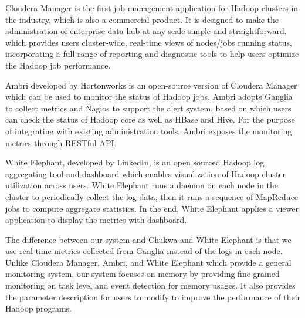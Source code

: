 Cloudera Manager\cite{http://www.cloudera.com} is the first job management application for Hadoop clusters in the industry, which is also a commercial product.
It is designed to make the administration of enterprise data hub at any scale simple and straightforward, which provides users cluster-wide, real-time views of nodes/jobs running status, incorporating a full range of reporting and diagnostic tools to help users optimize the Hadoop job performance.

Ambri\cite{http://hortonworks.com/hadoop/ambari} developed by Hortonworks is an open-source version of Cloudera Manager which can be used to monitor the status of Hadoop jobs.
Ambri adopts Ganglia to collect metrics and Nagios to support the alert system, based on which users can check the status of Hadoop core as well as HBase and Hive.
For the purpose of integrating with existing administration tools, Ambri exposes the monitoring metrics through RESTful API.
\par
White Elephant\cite{http://data.linkedin.com/opensource/white-elephant}, developed by LinkedIn, is an open sourced Hadoop log aggregating tool and dashboard which enables visualization of Hadoop cluster utilization across users. 
White Elephant runs a daemon on each node in the cluster to periodically collect the log data, then it runs a sequence of MapReduce jobs to compute aggregate statistics. In the end, White Elephant applies a viewer application to display the metrics with dashboard.
\par
The difference between our system and Chukwa and White Elephant is that we use real-time metrics collected from Ganglia instead of the logs in each node.
Unlike Cloudera Manager, Ambri, and White Elephant which provide a general monitoring system, our system focuses on memory by providing fine-grained monitoring on task level and event detection for memory usages. It also provides the parameter description for users to modify to improve the performance of their Hadoop programs.


